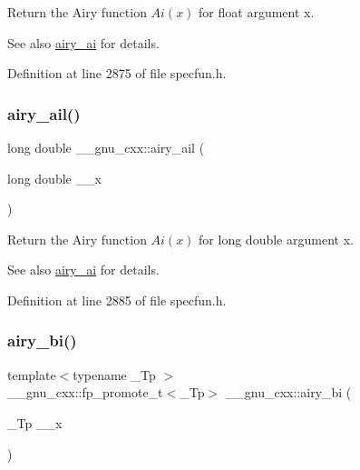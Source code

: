 Return the Airy function $ Ai(x) $ for {\ttfamily float} argument {\ttfamily x}.

\begin{DoxySeeAlso}{See also}
\hyperlink{group__mathsf__gnu_gac84f8c4ad00ee677ad4d0b785925d983}{airy\+\_\+ai} for details. 
\end{DoxySeeAlso}


Definition at line 2875 of file specfun.\+h.

\mbox{\label{group__mathsf__gnu_ga800fdb61c672ae1831f4ca4250d657de}} 
\subsubsection{\texorpdfstring{airy\+\_\+ail()}{airy\_ail()}}
{\footnotesize\ttfamily long double \+\_\+\+\_\+gnu\+\_\+cxx\+::airy\+\_\+ail (\begin{DoxyParamCaption}\item[{long double}]{\+\_\+\+\_\+x }\end{DoxyParamCaption})\hspace{0.3cm}{\ttfamily [inline]}}

Return the Airy function $ Ai(x) $ for {\ttfamily long double} argument {\ttfamily x}.

\begin{DoxySeeAlso}{See also}
\hyperlink{group__mathsf__gnu_gac84f8c4ad00ee677ad4d0b785925d983}{airy\+\_\+ai} for details. 
\end{DoxySeeAlso}


Definition at line 2885 of file specfun.\+h.

\mbox{\label{group__mathsf__gnu_ga33c172cab7f8e9c99537444c7e30801a}} 
\subsubsection{\texorpdfstring{airy\+\_\+bi()}{airy\_bi()}\hspace{0.1cm}{\footnotesize\ttfamily [1/2]}}
{\footnotesize\ttfamily template$<$typename \+\_\+\+Tp $>$ \\
\+\_\+\+\_\+gnu\+\_\+cxx\+::fp\+\_\+promote\+\_\+t$<$\+\_\+\+Tp$>$ \+\_\+\+\_\+gnu\+\_\+cxx\+::airy\+\_\+bi (\begin{DoxyParamCaption}\item[{\+\_\+\+Tp}]{\+\_\+\+\_\+x }\end{DoxyParamCaption})\hspace{0.3cm}{\ttfamily [inline]}}

